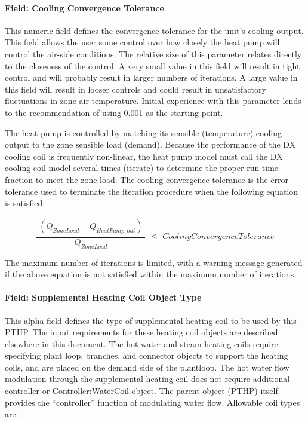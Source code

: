 \paragraph{Field: Cooling Convergence Tolerance}\label{field-cooling-convergence-tolerance-3}

This numeric field defines the convergence tolerance for the unit's cooling output. This field allows the user some control over how closely the heat pump will control the air-side conditions. The relative size of this parameter relates directly to the closeness of the control. A very small value in this field will result in tight control and will probably result in larger numbers of iterations. A large value in this field will result in looser controls and could result in unsatisfactory fluctuations in zone air temperature. Initial experience with this parameter lends to the recommendation of using 0.001 as the starting point.

The heat pump is controlled by matching its sensible (temperature) cooling output to the zone sensible load (demand). Because the performance of the DX cooling coil is frequently non-linear, the heat pump model must call the DX cooling coil model several times (iterate) to determine the proper run time fraction to meet the zone load. The cooling convergence tolerance is the error tolerance used to terminate the iteration procedure when the following equation is satisfied:

\begin{equation}
\frac{{\left| {({Q_{ZoneLoad}} - {Q_{HeatPump,out}})} \right|}}{{{Q_{ZoneLoad}}}}\,\, \le \,\,Cooling Convergence Tolerance
\end{equation}

The maximum number of iterations is limited, with a warning message generated if the above equation is not satisfied within the maximum number of iterations.

\paragraph{Field: Supplemental Heating Coil Object Type}\label{field-supplemental-heating-coil-object-type-000}

This alpha field defines the type of supplemental heating coil to be used by this PTHP. The input requirements for these heating coil objects are described elsewhere in this document. The hot water and steam heating coils require specifying plant loop, branches, and connector objects to support the heating coils, and are placed on the demand side of the plantloop. The hot water flow modulation through the supplemental heating coil does not require additional controller or \hyperref[controllerwatercoil]{Controller:WaterCoil} object. The parent object (PTHP) itself provides the ``controller'' function of modulating water flow. Allowable coil types are:

